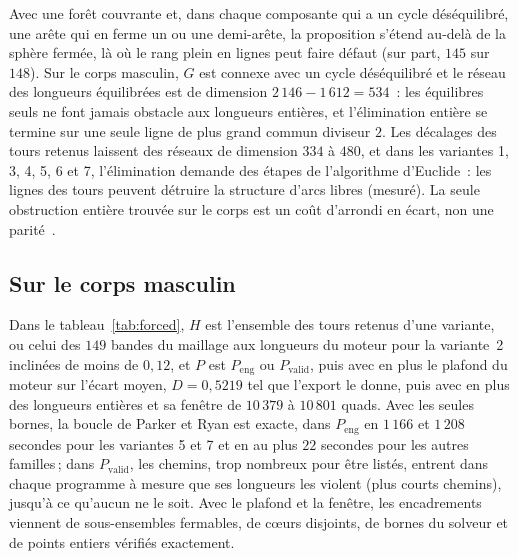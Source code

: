 \documentclass[11pt,a4paper]{article}
\begin{document}
Avec une forêt couvrante et, dans chaque composante qui a un cycle
déséquilibré, une arête qui en ferme un ou une demi-arête, la proposition
s'étend au-delà de la sphère fermée, là où le rang plein en lignes peut faire
défaut (sur part, $145$ sur $148$). Sur le corps masculin, $G$ est connexe
avec un cycle déséquilibré et le réseau des longueurs équilibrées est de
dimension $2\,146 - 1\,612 = 534$~: les équilibres seuls ne font jamais
obstacle aux longueurs entières, et l'élimination entière se termine sur une
seule ligne de plus grand commun diviseur $2$. Les décalages des tours retenus
laissent des réseaux de dimension $334$ à $480$, et dans les variantes 1, 3,
4, 5, 6 et 7, l'élimination demande des étapes de l'algorithme d'Euclide~: les
lignes des tours peuvent détruire la structure d'arcs libres (mesuré). La
seule obstruction entière trouvée sur le corps est un coût d'arrondi en écart,
non une parité~\cite[\S7]{gardent2026loops}. %

\subsection{Sur le corps masculin}

Dans le tableau~\ref{tab:forced}, $H$ est l'ensemble des tours retenus d'une
variante, ou celui des $149$ bandes du maillage aux longueurs du moteur pour
la variante~2 inclinées de moins de $0,12$, et $P$ est $P_{\mathrm{eng}}$
ou $P_{\mathrm{valid}}$, puis avec en plus le plafond du moteur sur l'écart moyen,
$D = 0,5219$ tel que l'export le donne, puis avec en plus des longueurs
entières et sa fenêtre de $10\,379$ à $10\,801$ quads. Avec les seules
bornes, la boucle de Parker et Ryan est exacte, dans
$P_{\mathrm{eng}}$ en $1\,166$ et $1\,208$ secondes pour les variantes 5 et 7
et en au plus $22$ secondes pour les autres familles\,; dans
$P_{\mathrm{valid}}$, les chemins, trop nombreux pour être listés, entrent
dans chaque programme à mesure que ses longueurs les violent (plus courts
chemins), jusqu'à ce qu'aucun ne le soit. Avec le plafond et la fenêtre, les encadrements
viennent de sous-ensembles fermables, de cœurs disjoints, de bornes du
solveur et de points entiers vérifiés exactement.
\end{document}
